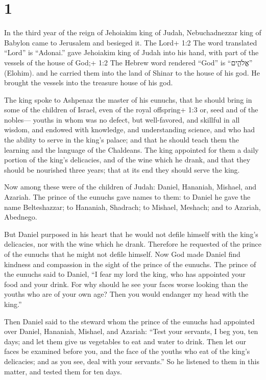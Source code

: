 \hypertarget{section}{%
\section{1}\label{section}}

 In the third year of the reign of Jehoiakim king of Judah,
Nebuchadnezzar king of Babylon came to Jerusalem and besieged it.
 The Lord+ 1:2 The word translated ``Lord'' is ``Adonai.''
gave Jehoiakim king of Judah into his hand, with part of the vessels of
the house of God;+ 1:2 The Hebrew word rendered ``God'' is ``אֱלֹהִ֑ים''
(Elohim). and he carried them into the land of Shinar to the house of
his god. He brought the vessels into the treasure house of his god.

 The king spoke to Ashpenaz the master of his eunuchs, that
he should bring in some of the children of Israel, even of the royal
offspring+ 1:3 or, seed and of the nobles---  youths in whom
was no defect, but well-favored, and skillful in all wisdom, and endowed
with knowledge, and understanding science, and who had the ability to
serve in the king's palace; and that he should teach them the learning
and the language of the Chaldeans.  The king appointed for
them a daily portion of the king's delicacies, and of the wine which he
drank, and that they should be nourished three years; that at its end
they should serve the king.

 Now among these were of the children of Judah: Daniel,
Hananiah, Mishael, and Azariah.  The prince of the eunuchs
gave names to them: to Daniel he gave the name Belteshazzar; to
Hananiah, Shadrach; to Mishael, Meshach; and to Azariah, Abednego.

 But Daniel purposed in his heart that he would not defile
himself with the king's delicacies, nor with the wine which he drank.
Therefore he requested of the prince of the eunuchs that he might not
defile himself.  Now God made Daniel find kindness and
compassion in the sight of the prince of the eunuchs.  The
prince of the eunuchs said to Daniel, ``I fear my lord the king, who has
appointed your food and your drink. For why should he see your faces
worse looking than the youths who are of your own age? Then you would
endanger my head with the king.''

 Then Daniel said to the steward whom the prince of the
eunuchs had appointed over Daniel, Hananiah, Mishael, and Azariah:
 ``Test your servants, I beg you, ten days; and let them
give us vegetables to eat and water to drink.  Then let our
faces be examined before you, and the face of the youths who eat of the
king's delicacies; and as you see, deal with your servants.''
 So he listened to them in this matter, and tested them for
ten days.

